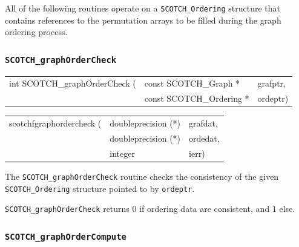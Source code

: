 All of the following routines operate on a {\tt SCOTCH\_\lbt Ordering}
structure that contains references to the permutation arrays to be
filled during the graph ordering process.

\subsubsection{{\tt SCOTCH\_graphOrderCheck}}

\begin{itemize}
\progsyn

{\tt\begin{tabular}{l@{}ll}
int SCOTCH\_graphOrderCheck ( & const SCOTCH\_Graph *    & grafptr, \\
                              & const SCOTCH\_Ordering * & ordeptr)
\end{tabular}}

{\tt\begin{tabular}{l@{}ll}
scotchfgraphordercheck ( & doubleprecision (*) & grafdat, \\
                         & doubleprecision (*) & ordedat, \\
                         & integer             & ierr)
\end{tabular}}

\progdes

The {\tt SCOTCH\_graphOrderCheck} routine checks the consistency of
the given {\tt SCOTCH\_\lbt Ordering} structure pointed to by {\tt ordeptr}.

\progret

{\tt SCOTCH\_graphOrderCheck} returns $0$ if ordering data are consistent, and
$1$ else.

\end{itemize}

\subsubsection{{\tt SCOTCH\_graphOrderCompute}}

